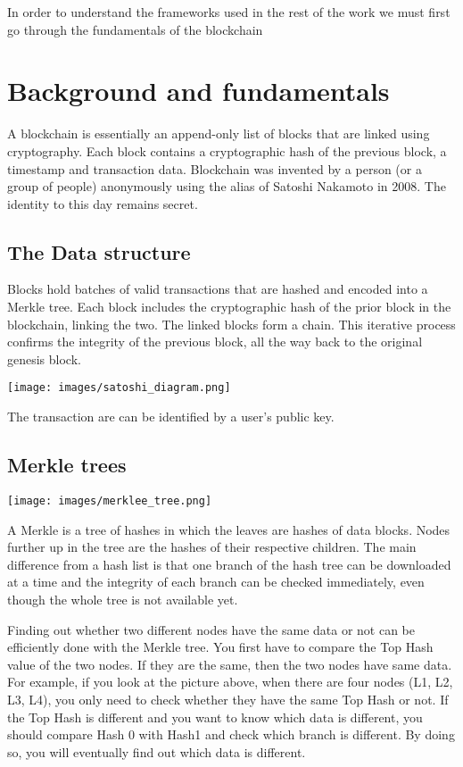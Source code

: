 \documentclass{article}
\begin{document}
\pagebreak

In order to understand the frameworks used in the rest of the work we must first go through the fundamentals of the blockchain

\section{Background and fundamentals}

A blockchain is essentially an append-only list of blocks that are linked using cryptography. Each block contains a cryptographic hash of the previous block, a timestamp and transaction data. \newline
Blockchain was invented by a person (or a group of people) anonymously using the alias of Satoshi Nakamoto in 2008. The identity to this day remains secret.

\subsection{The Data structure}

Blocks hold batches of valid transactions that are hashed and encoded into a Merkle tree. Each block includes the cryptographic hash of the prior block in the blockchain, linking the two. The linked blocks form a chain. This iterative process confirms the integrity of the previous block, all the way back to the original genesis block.

\texttt{[image: images/satoshi\_diagram.png]}

The transaction are can be identified by a user's public key. \newline

\subsection{Merkle trees}

\texttt{[image: images/merklee\_tree.png]}

A Merkle is a tree of hashes in which the leaves are hashes of data blocks. Nodes further up in the tree are the hashes of their respective children. The main difference from a hash list is that one branch of the hash tree can be downloaded at a time and the integrity of each branch can be checked immediately, even though the whole tree is not available yet. 

Finding out whether two different nodes have the same data or not can be efficiently done with the Merkle tree. You first have to compare the Top Hash value of the two nodes. If they are the same, then the two nodes have same data. For example, if you look at the picture above, when there are four nodes (L1, L2, L3, L4), you only need to check whether they have the same Top Hash or not. If the Top Hash is different and you want to know which data is different, you should compare Hash 0 with Hash1 and check which branch is different. By doing so, you will eventually find out which data is different.
\end{document}
